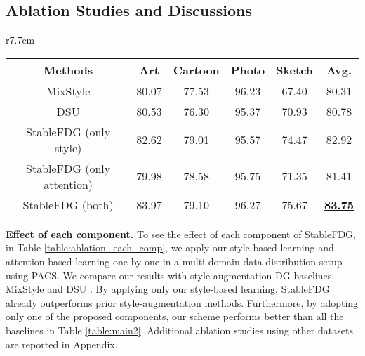 \documentclass{article}
\theoremstyle{plain}
\theoremstyle{definition}
\theoremstyle{remark}
\begin{document}
 
 
\vspace{-1mm}

\subsection{Ablation Studies and Discussions } \label{subsec:ablation}


\vspace{-1mm}

\begin{wraptable}{r}{7.7cm}
\vspace{-3.5mm}
\tiny
\centering
	\begin{tabular}{c|cccc|c}
		\toprule  
	 Methods    & Art & Cartoon	& Photo & Sketch & Avg.  \\
		\midrule
		MixStyle  \cite{zhou2021domain}  &80.07&	77.53&96.23&67.40&80.31\\
		DSU  \cite{li2022uncertainty}    &  80.53&	76.30&	95.37&	70.93&	80.78\\		
		StableFDG (only style)  & 82.62 &79.01& 95.57 &74.47& 82.92\\
		StableFDG (only attention)  & 79.98& 78.58& 95.75& 71.35& 81.41\\
		StableFDG (both)  & 83.97& 79.10& 96.27& 75.67& \textbf{\underline{83.75}}\\
		\bottomrule
	\end{tabular}
			\vspace{-0.5mm}
 		\caption{Effect of each component of StableFDG.}
		\vspace{-3mm}
\label{table:ablation_each_comp}
\end{wraptable}  


\textbf{Effect of each component.} To see the effect of each component of StableFDG, in Table \ref{table:ablation_each_comp}, we apply our style-based learning and attention-based learning   one-by-one in a multi-domain data distribution setup using PACS. We compare our results with style-augmentation  DG baselines, MixStyle \cite{zhou2021domain} and DSU \cite{li2022uncertainty}. By applying only our style-based learning, StableFDG already outperforms prior style-augmentation methods.
 Furthermore, by adopting only one of the proposed components, our scheme   performs better than all the baselines in Table   \ref{table:main2}.  Additional   ablation studies using other datasets are reported in Appendix.
\end{document}
